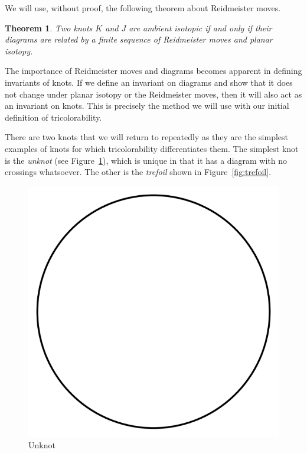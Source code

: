 \documentclass[12pt]{amsart}
\newtheorem{theorem}{Theorem}[section]
\theoremstyle{definition}
\theoremstyle{remark}
\numberwithin{equation}{section}
\newcommand{\ds}{.3}
\begin{document}
We will use, without proof, the following theorem about Reidmeister moves.

\begin{theorem}
  Two knots $K$ and $J$ are ambient isotopic if and only if their diagrams
  are related by a finite sequence of Reidmeister moves and planar isotopy.
\end{theorem}

The importance of Reidmeister moves and diagrams becomes apparent
in defining invariants of knots. If we define an invariant on diagrams and show
that it does not change under planar isotopy or the Reidmeister moves, then
it will also act as an invariant on knots. This is precisely the method we
will use with our initial definition of tricolorability.

There are two knots that we will return to repeatedly
as they are the simplest examples of knots for which tricolorability
differentiates them. The simplest knot is the \textit{unknot} (see Figure~\ref{fig:unknot}), which
is unique in that it has a diagram with no crossings whatsoever. The
other is the \textit{trefoil} shown in Figure~\ref{fig:trefoil}.

\begin{figure}
  \includegraphics[scale=\ds]{unknot}
  \caption{Unknot}
  \label{fig:unknot}
\end{figure}
\end{document}
